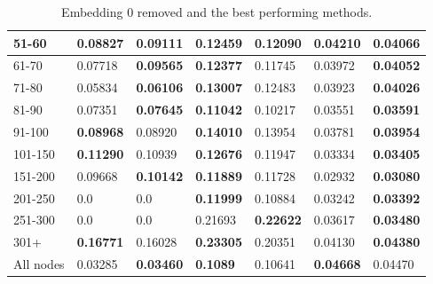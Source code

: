 \begin{table}[h!]
\begin{tabular}{|l|l|l||l|l||l|l|}
        51-60     & 0.08827                                 & \textbf{0.09111}               & \textbf{0.12459}                 & 0.12090           & \textbf{0.04210} & 0.04066           \\ \hline
        61-70     & 0.07718                                 & \textbf{0.09565}               & \textbf{0.12377}                 & 0.11745           & 0.03972          & \textbf{0.04052}  \\ \hline
        71-80     & 0.05834                                 & \textbf{0.06106}               & \textbf{0.13007}                 & 0.12483           & 0.03923          & \textbf{0.04026}  \\ \hline
        81-90     & 0.07351                                 & \textbf{0.07645}               & \textbf{0.11042}                 & 0.10217           & 0.03551          & \textbf{0.03591}  \\ \hline
        91-100    & \textbf{0.08968}                        & 0.08920                        & \textbf{0.14010}                 & 0.13954           & 0.03781          & \textbf{0.03954}  \\ \hline
        101-150   & \textbf{0.11290}                        & 0.10939                        & \textbf{0.12676}                 & 0.11947           & 0.03334          & \textbf{0.03405}  \\ \hline
        151-200   & 0.09668                                 & \textbf{0.10142}               & \textbf{0.11889}                 & 0.11728           & 0.02932          & \textbf{0.03080}  \\ \hline
        201-250   & 0.0                                     & 0.0                            & \textbf{0.11999}                 & 0.10884           & 0.03242          & \textbf{0.03392}  \\ \hline
        251-300   & 0.0                                     & 0.0                            & 0.21693                          & \textbf{0.22622}  & 0.03617          & \textbf{0.03480}  \\ \hline
        301+      & \textbf{0.16771}                        & 0.16028                        & \textbf{0.23305}                 & 0.20351           & 0.04130          & \textbf{0.04380}  \\ \hline
        All nodes & 0.03285                                 & \textbf{0.03460}               & \textbf{0.1089}                  & 0.10641           & \textbf{0.04668} & 0.04470           \\ \hline
    \end{tabular}
    \label{tab:ndcg-adjusted-layer-remove-0-embedding}
    \caption{Embedding 0 removed and the best performing methods.}
\end{table}


